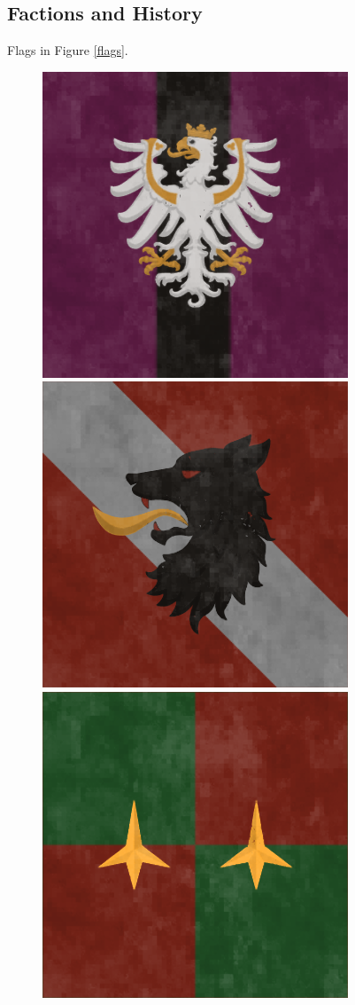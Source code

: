 \subsection{Factions and History}

Flags in Figure \ref{flags}.

\begin{figure}[!ht]
    \centering      
        \includegraphics[scale=0.25]{img/flag/atheryn.png}
        \includegraphics[scale=0.25]{img/flag/eskand.png}
        \includegraphics[scale=0.25]{img/flag/fnc.png}

\end{figure}
